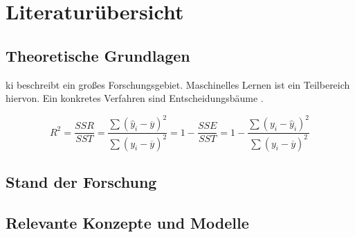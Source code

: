 \chapter{Literaturübersicht}

\section{Theoretische Grundlagen}

\Gls{ki} beschreibt ein großes Forschungsgebiet. Maschinelles Lernen ist ein Teilbereich hiervon. Ein konkretes Verfahren sind Entscheidungsbäume \autocite{knuth_2021}.

\lipsum[1]

\begin{equation}
  \mathit{R}^2=\frac{SSR}{SST}=
  \frac{\sum\nolimits \left(\hat{y}_i-\overline{y}\right)^2}{\sum\nolimits\left(y_i-\overline{y}\right)^2}=1-\frac{SSE}{SST}=1-\frac{\sum\nolimits\left(y_i-\hat{y}_i\right)^2}{\sum\nolimits \left(y_i-\overline{y}\right)^2}
\end{equation}

\lipsum[2]

\section{Stand der Forschung}

\lipsum[2]

\section{Relevante Konzepte und Modelle}

\lipsum[3-5]


